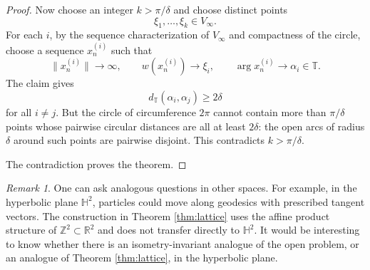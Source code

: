 \documentclass[11pt]{article}
\theoremstyle{remark}
\newtheorem{remark}[theorem]{Remark}
\begin{document}
\begin{proof}
Now choose an integer $k>\pi/\delta$ and choose distinct points
\[
\xi_1,\ldots,\xi_k\in V_\infty .
\]
For each $i$, by the sequence characterization of $V_\infty$ and compactness of the circle, choose a sequence $x_n^{(i)}$ such that
\[
\|x_n^{(i)}\|\to\infty,
\qquad
w(x_n^{(i)})\to\xi_i,
\qquad
\arg x_n^{(i)}\to\alpha_i\in\mathbb T .
\]
The claim gives
\[
d_{\mathbb T}(\alpha_i,\alpha_j)\ge 2\delta
\]
for all $i\ne j$. But the circle of circumference $2\pi$ cannot contain more than $\pi/\delta$ points whose pairwise circular distances are all at least $2\delta$: the open arcs of radius $\delta$ around such points are pairwise disjoint. This contradicts $k>\pi/\delta$.

The contradiction proves the theorem.
\end{proof}

\begin{remark}
One can ask analogous questions in other spaces. For example, in the hyperbolic plane $\mathbb H^2$, particles could move along geodesics with prescribed tangent vectors. The construction in Theorem \ref{thm:lattice} uses the affine product structure of $\mathbb Z^2\subset\mathbb R^2$ and does not transfer directly to $\mathbb H^2$. It would be interesting to know whether there is an isometry-invariant analogue of the open problem, or an analogue of Theorem \ref{thm:lattice}, in the hyperbolic plane.
\end{remark}
\end{document}
